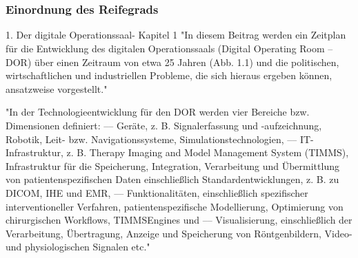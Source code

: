 \chapter{}
\label{sec:overview}


\subsection{Einordnung des Reifegrads}
1. Der digitale Operationssaal- Kapitel 1
	"In diesem Beitrag werden ein Zeitplan für die Entwicklung
	des digitalen Operationssaals (Digital Operating Room – DOR) über einen Zeitraum
	von etwa 25 Jahren (Abb. 1.1) und die politischen, wirtschaftlichen und industriellen
	Probleme, die sich hieraus ergeben können, ansatzweise vorgestellt."
	
	"In der Technologieentwicklung für den DOR werden vier Bereiche bzw. Dimensionen
	definiert:
	–– Geräte, z. B. Signalerfassung und -aufzeichnung, Robotik, Leit- bzw. Navigationssysteme,
	Simulationstechnologien,
	–– IT-Infrastruktur, z. B. Therapy Imaging and Model Management System (TIMMS),
	Infrastruktur für die Speicherung, Integration, Verarbeitung und Übermittlung
	von patientenspezifischen Daten einschließlich Standardentwicklungen, z. B. zu
	DICOM, IHE und EMR,
	–– Funktionalitäten, einschließlich spezifischer interventioneller Verfahren, patientenspezifische
	Modellierung, Optimierung von chirurgischen Workflows, TIMMSEngines
	und
	–– Visualisierung, einschließlich der Verarbeitung, Übertragung, Anzeige und Speicherung
	von Röntgenbildern, Video- und physiologischen Signalen etc."
	
